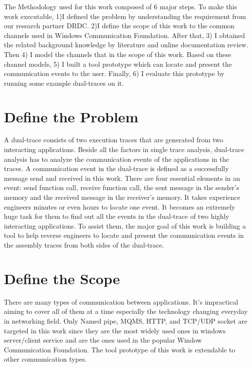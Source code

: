 The Methodology used for this work composed of 6 major steps. To make this work executable, 1)I defined the problem by understanding the requirement from our research partner DRDC.  2)I define the scope of this work to the common channels used in Windows Communication Foundation. After that, 3) I obtained the related background knowledge by literature and online documentation review. Then 4) I model the channels that in the scope of this work. Based on these channel models, 5) I built a tool prototype which can locate and present the communication events to the user. Finally, 6) I evaluate this prototype by running some example dual-traces on it.

\label{chapter:problem}

\newlength{\savedunitlength}
\setlength{\unitlength}{2em}
\section{Define the Problem}
A dual-trace consists of two execution traces that are generated from two interacting applications. Beside all the factors in single trace analysis, dual-trace analysis has to analyze the communication events of the applications in the traces. A communication event in the dual-trace is defined as a successfully message send and received in this work. There are four essential elements in an event: send function call, receive function call, the sent message in the sender's memory and the received message in the receiver's memory. It takes experience engineers minutes or even hours to locate one event. It becomes an extremely huge task for them to find out all the events in the dual-trace of two highly interacting applications. To assist them, the major goal of this work is building a tool to help reverse engineers to locate and present the communication events in the assembly traces from both sides of the dual-trace. 


\section{Define the Scope}
There are many types of communication between applications. It's impractical aiming to cover all of them at a time especially the technology changing everyday in networking field. Only Named pipe, MQMS, HTTP, and TCP/UDP socket are targeted in this work since they are the most widely used ones in windows server/client service and are the ones used in the popular Window Communication Foundation. The tool prototype of this work is extendable to other communication types.

